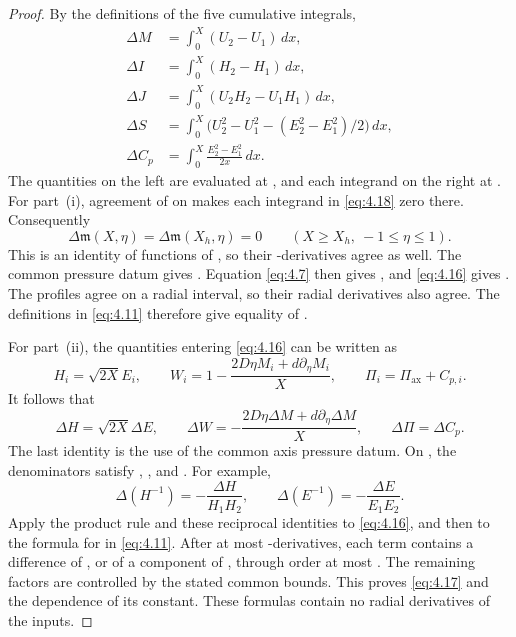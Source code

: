 \begin{proof}
By the definitions of the five cumulative integrals,
\begin{equation}
\begin{aligned}
 \Delta M&=\int_0^X(U_2-U_1)\,dx,\\
 \Delta I&=\int_0^X(H_2-H_1)\,dx,\\
 \Delta J&=\int_0^X(U_2H_2-U_1H_1)\,dx,\\
 \Delta S&=\int_0^X\bigl(U_2^2-U_1^2-(E_2^2-E_1^2)/2\bigr)\,dx,\\
 \Delta C_p&=\int_0^X\frac{E_2^2-E_1^2}{2x}\,dx.
\end{aligned}
\tag{4.18}\label{eq:4.18}
\end{equation}
The quantities on the left are evaluated at
, and each integrand on the right at
. For part~\textup{(i)}, agreement of
 on  makes each
integrand in \eqref{eq:4.18} zero there. Consequently
\[
 \Delta\mathfrak m(X,\eta)=\Delta\mathfrak m(X_h,\eta)=0
 \qquad(X\geq X_h,\ -1\leq\eta\leq1).
\]
This is an identity of functions of , so their
-derivatives agree as well. The common pressure datum
gives . Equation \eqref{eq:4.7}
then gives , and \eqref{eq:4.16} gives
. The profiles agree on a radial
interval, so their radial derivatives also agree. The definitions in
\eqref{eq:4.11} therefore give equality of
.

For part~\textup{(ii)}, the quantities entering \eqref{eq:4.16} can be written
as
\[
 H_i=\sqrt{2X}E_i,
 \qquad
 W_i=1-\frac{2D\eta M_i+d\partial_\eta M_i}{X},
 \qquad
 \Pi_i=\Pi_{\mathrm{ax}}+C_{p,i}.
\]
It follows that
\[
 \Delta H=\sqrt{2X}\Delta E,
 \qquad
 \Delta W=-\frac{2D\eta\Delta M+d\partial_\eta\Delta M}{X},
 \qquad
 \Delta\Pi=\Delta C_p.
\]
The last identity is the use of the common axis pressure datum. On
, the denominators satisfy
,
, and
. For example,
\[
 \Delta(H^{-1})=-\frac{\Delta H}{H_1H_2},
 \qquad
 \Delta(E^{-1})=-\frac{\Delta E}{E_1E_2}.
\]
Apply the product rule and these reciprocal identities to \eqref{eq:4.16},
and then to the formula for  in \eqref{eq:4.11}.
After at most 
-derivatives, each term contains a difference of
, or of
%
a component of , through order at most
. The remaining factors are controlled by the stated
common bounds. This proves \eqref{eq:4.17} and the dependence of its constant.
These formulas contain no radial derivatives of the inputs.
\end{proof}

